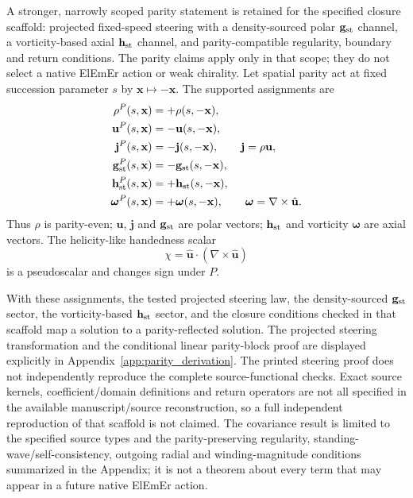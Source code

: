\documentclass[11pt]{article}
\theoremstyle{definition}
\newcommand{\ElEmEr}{\mbox{ElEmEr}}
\begin{document}
A stronger, narrowly scoped parity statement is retained for the specified
closure scaffold: projected fixed-speed steering with a density-sourced polar
$\mathbf g_{\rm st}$ channel, a vorticity-based axial $\mathbf h_{\rm st}$
channel, and parity-compatible regularity, boundary and return conditions.
The parity claims apply only in that scope; they do not select a native
ElEmEr action or weak chirality.  Let spatial parity act at fixed succession parameter $s$ by $\mathbf x\mapsto-\mathbf x$.  The supported assignments are
\begin{equation}
\begin{aligned}
 \rho^{P}(s,\mathbf x)&=+\rho(s,-\mathbf x),\\
 \mathbf u^{P}(s,\mathbf x)&=-\mathbf u(s,-\mathbf x),\\
 \mathbf j^{P}(s,\mathbf x)&=-\mathbf j(s,-\mathbf x),\qquad \mathbf j=\rho\mathbf u,\\
 \mathbf g_{\rm st}^{P}(s,\mathbf x)&=-\mathbf g_{\rm st}(s,-\mathbf x),\\
 \mathbf h_{\rm st}^{P}(s,\mathbf x)&=+\mathbf h_{\rm st}(s,-\mathbf x),\\
 \boldsymbol\omega^{P}(s,\mathbf x)&=+\boldsymbol\omega(s,-\mathbf x),\qquad
 \boldsymbol\omega=\nabla\times\hat{\mathbf u}.
\end{aligned}
\label{eq:parity_assignments}
\end{equation}
Thus $\rho$ is parity-even; $\mathbf u$, $\mathbf j$ and $\mathbf g_{\rm st}$ are polar vectors; $\mathbf h_{\rm st}$ and vorticity $\boldsymbol\omega$ are axial vectors.  The helicity-like handedness scalar
\begin{equation}
 \chi=\hat{\mathbf u}\cdot(\nabla\times\hat{\mathbf u})
 \label{eq:helicity_pseudoscalar}
\end{equation}
is a pseudoscalar and changes sign under $P$.

With these assignments, the tested projected steering law, the density-sourced $\mathbf g_{\rm st}$ sector, the vorticity-based $\mathbf h_{\rm st}$ sector, and the closure conditions checked in that scaffold map a solution to a parity-reflected solution.  The projected steering transformation and the conditional linear parity-block proof are displayed explicitly in Appendix~\ref{app:parity_derivation}.  The printed steering proof does not independently reproduce the complete
source-functional checks.  Exact source kernels, coefficient/domain definitions
and return operators are not all specified in the available manuscript/source
reconstruction, so a full independent reproduction of that scaffold is not
claimed.  The covariance result is limited to the specified source types and
the parity-preserving regularity, standing-wave/self-consistency, outgoing
radial and winding-magnitude conditions summarized in the Appendix; it is not a theorem about every term that may appear in a future native \ElEmEr{} action.
\end{document}
